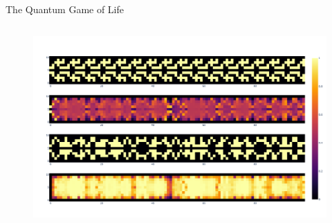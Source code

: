 \documentclass[aspectratio=169]{beamer}
\begin{document}
\begin{frame}[t]{The Quantum Game of Life}
{\begin{columns}
{    \begin{figure}
        \centering
        \includegraphics[width=\columnwidth]{graphics/blinker_150_all.png}
    \end{figure}
    }
\end{columns}}
\end{frame}
\end{document}
